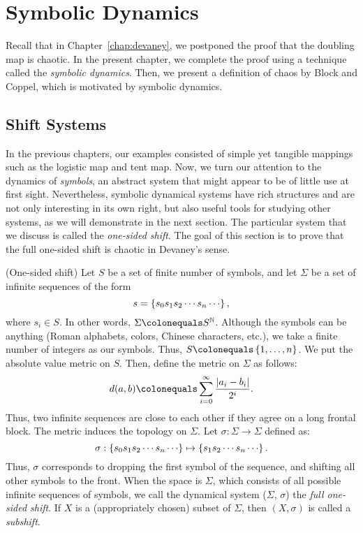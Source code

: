 \documentclass[10pt,twoside]{book}
\begin{document}
\chapter{Symbolic Dynamics}
\label{chap:symbolic}
Recall that in Chapter~\ref{chap:devaney}, we postponed the proof that the doubling map is chaotic.
In the present chapter, we complete the proof using a technique called the \textit{symbolic dynamics}.
Then, we present a definition of chaos by Block and Coppel, which is motivated by symbolic dynamics.

\section{Shift Systems}
In the previous chapters, our examples consisted of simple yet tangible mappings such as the logistic map and tent map.
Now, we turn our attention to the dynamics of \textit{symbols}, an abstract system that might appear to be of little use at first sight.
Nevertheless, symbolic dynamical systems have rich structures and are not only interesting in its own right, but also useful tools for studying other systems, as we will demonstrate in the next section.
The particular system that we discuss is called the \textit{one-sided shift}.
The goal of this section is to prove that the full one-sided shift is chaotic in Devaney's sense.
\begin{definition}
  (One-sided shift)
  Let $S$ be a set of finite number of symbols, and let $\Sigma$ be a set of infinite sequences of the form
  \begin{equation*}
    s = \set{ s_0 s_1 s_2 \cdots s_n \cdots },
  \end{equation*}
  where $s_i \in S$.
  In other words, $\Sigma \ceq S^\N$.
  Although the symbols can be anything (Roman alphabets, colors, Chinese characters, etc.), we take a finite number of integers as our symbols.
  Thus, $S \ceq \set{1, \ldots, n}$.
  We put the absolute value metric on $S$.
  Then, define the metric on $\Sigma$ as follows:
  \begin{equation*}
    d(a,b) \ceq \sum\limits_{i = 0}^{\infty} \frac{\abs{a_i - b_i}}{2^i}.
  \end{equation*}
  Thus, two infinite sequences are close to each other if they agree on a long frontal block.
  The metric induces the topology on $\Sigma$.
  Let $\sigma: \Sigma \to \Sigma$ defined as:
  \begin{equation*}
    \sigma: \set{ s_0 s_1 s_2 \cdots s_n \cdots } 
    \mapsto 
    \set{ s_1 s_2 \cdots s_n \cdots }.
  \end{equation*}
  Thus, $\sigma$ corresponds to dropping the first symbol of the sequence, and shifting all other symbols to the front.
  When the space is $\Sigma$, which consists of all possible infinite sequences of symbols, we call the dynamical system ($\Sigma$, $\sigma$) the \textit{full one-sided shift}.
  If $X$ is a (appropriately chosen) subset of $\Sigma$, then $(X, \sigma)$ is called a \textit{subshift}.
\end{definition}
\end{document}
